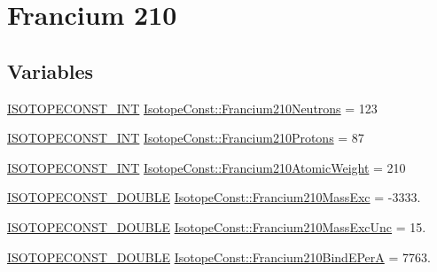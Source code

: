 \hypertarget{group___isotope_const-_francium-_fr210}{}\section{Francium 210}
\label{group___isotope_const-_francium-_fr210}
\subsection*{Variables}
\begin{DoxyCompactItemize}
\item 
\mbox{\hyperlink{group___isotope_const-_macros_ga5f18360b3e99483a35c32d789e62621c}{I\+S\+O\+T\+O\+P\+E\+C\+O\+N\+S\+T\+\_\+\+I\+NT}} \mbox{\hyperlink{group___isotope_const-_francium-_fr210_ga685576ec6d016db9ffe28cdecdb7ac35}{Isotope\+Const\+::\+Francium210\+Neutrons}} = 123
\item 
\mbox{\hyperlink{group___isotope_const-_macros_ga5f18360b3e99483a35c32d789e62621c}{I\+S\+O\+T\+O\+P\+E\+C\+O\+N\+S\+T\+\_\+\+I\+NT}} \mbox{\hyperlink{group___isotope_const-_francium-_fr210_ga21c19cbf6296b7adaca98b2bf5ce6344}{Isotope\+Const\+::\+Francium210\+Protons}} = 87
\item 
\mbox{\hyperlink{group___isotope_const-_macros_ga5f18360b3e99483a35c32d789e62621c}{I\+S\+O\+T\+O\+P\+E\+C\+O\+N\+S\+T\+\_\+\+I\+NT}} \mbox{\hyperlink{group___isotope_const-_francium-_fr210_ga07bb3d4b630cd1862f03fe0908053994}{Isotope\+Const\+::\+Francium210\+Atomic\+Weight}} = 210
\item 
\mbox{\hyperlink{group___isotope_const-_macros_ga8f45a7272ce02c0b4c65c44636ed719a}{I\+S\+O\+T\+O\+P\+E\+C\+O\+N\+S\+T\+\_\+\+D\+O\+U\+B\+LE}} \mbox{\hyperlink{group___isotope_const-_francium-_fr210_ga7527634519496cd05a46c7e56aad77db}{Isotope\+Const\+::\+Francium210\+Mass\+Exc}} = -\/3333.
\item 
\mbox{\hyperlink{group___isotope_const-_macros_ga8f45a7272ce02c0b4c65c44636ed719a}{I\+S\+O\+T\+O\+P\+E\+C\+O\+N\+S\+T\+\_\+\+D\+O\+U\+B\+LE}} \mbox{\hyperlink{group___isotope_const-_francium-_fr210_ga1e4386ed1c28b1938c2ea7ca3ae03fb5}{Isotope\+Const\+::\+Francium210\+Mass\+Exc\+Unc}} = 15.
\item 
\mbox{\hyperlink{group___isotope_const-_macros_ga8f45a7272ce02c0b4c65c44636ed719a}{I\+S\+O\+T\+O\+P\+E\+C\+O\+N\+S\+T\+\_\+\+D\+O\+U\+B\+LE}} \mbox{\hyperlink{group___isotope_const-_francium-_fr210_ga35651981661a32a857f93b902d8efbef}{Isotope\+Const\+::\+Francium210\+Bind\+E\+PerA}} = 7763.
\item 

\end{DoxyCompactItemize}
